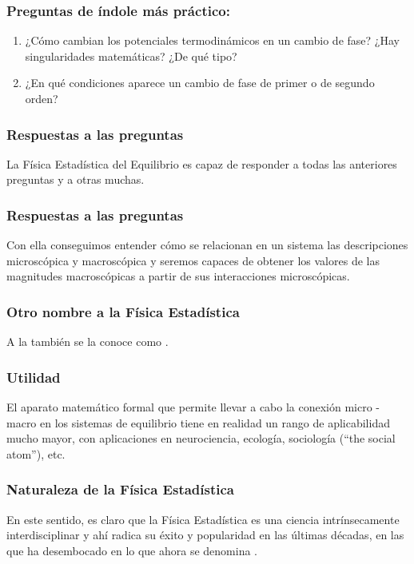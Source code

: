 \documentclass[12pt]{beamer}
\begin{document}
\begin{frame}
\frametitle{Preguntas de índole más práctico:}
\begin{enumerate}[<+->]
\conti
\item ¿Cómo cambian los potenciales termodinámicos en un cambio de fase? \pause ¿Hay singularidades matemáticas? \pause ¿De qué tipo?
\item ¿En qué condiciones aparece un cambio de fase de primer o de segundo orden?
\end{enumerate}
\end{frame}
\begin{frame}
\frametitle{Respuestas a las preguntas}
La Física Estadística del Equilibrio es capaz de responder a todas las anteriores preguntas y a otras muchas.
\end{frame}
\begin{frame}
\frametitle{Respuestas a las preguntas}
Con ella conseguimos entender cómo se relacionan en un sistema las descripciones microscópica y macroscópica y seremos capaces de obtener los valores de las magnitudes macroscópicas a partir de sus interacciones microscópicas.
\end{frame}
\begin{frame}
\frametitle{Otro nombre a la Física Estadística}
A la  también se la conoce como .
\end{frame}
\begin{frame}
\frametitle{Utilidad}
El aparato matemático formal que permite llevar a cabo la conexión micro - macro en los sistemas de equilibrio tiene en realidad un rango de aplicabilidad mucho mayor, \pause con aplicaciones en neurociencia, ecología, sociología (\enquote{the social atom}), etc.
\end{frame}
\begin{frame}
\frametitle{Naturaleza de la Física Estadística}
En este sentido, es claro que la Física Estadística es una ciencia intrínsecamente interdisciplinar y ahí radica su éxito y popularidad en las últimas décadas, \pause en las que ha desembocado en lo que ahora se denomina .
\end{frame}
\end{document}
